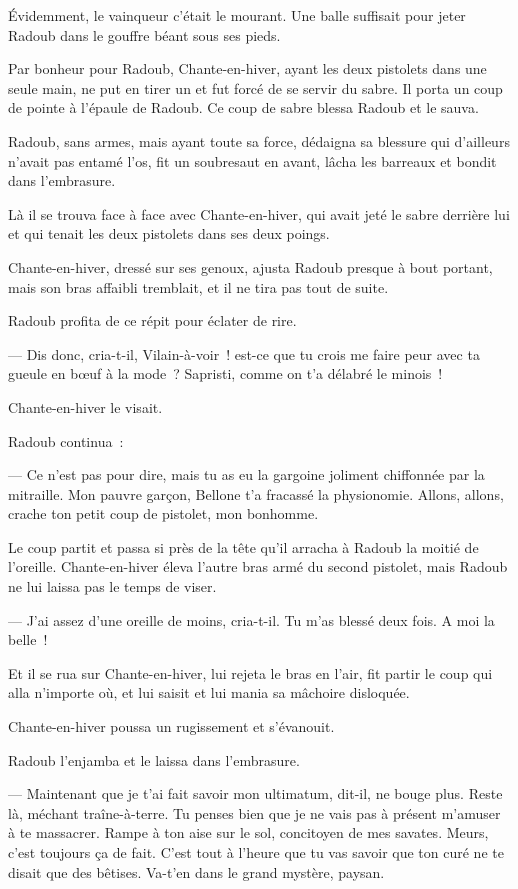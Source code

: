 \documentclass[french,twoside]{book} %
\begin{document}
Évidemment, le vainqueur c’était le mourant. Une balle suffisait pour jeter Radoub dans le gouffre béant sous ses pieds.\par
Par bonheur pour Radoub, Chante-en-hiver, ayant les deux pistolets dans une seule main, ne put en tirer un et fut forcé de se servir du sabre. Il porta un coup de pointe à l’épaule de Radoub. Ce coup de sabre blessa Radoub et le sauva.\par
Radoub, sans armes, mais ayant toute sa force, dédaigna sa blessure qui d’ailleurs n’avait pas entamé l’os, fit un soubresaut en avant, lâcha les barreaux et bondit dans l’embrasure.\par
Là il se trouva face à face avec Chante-en-hiver, qui avait jeté le sabre derrière lui et qui tenait les deux pistolets dans ses deux poings.\par
Chante-en-hiver, dressé sur ses genoux, ajusta Radoub presque à bout portant, mais son bras affaibli tremblait, et il ne tira pas tout de suite.\par
Radoub profita de ce répit pour éclater de rire.\par
 — Dis donc, cria-t-il, Vilain-à-voir ! est-ce que tu crois me faire peur avec ta gueule en bœuf à la mode ? Sapristi, comme on t’a délabré le minois !\par
Chante-en-hiver le visait.\par
Radoub continua :\par
— Ce n’est pas pour dire, mais tu as eu la gargoine joliment chiffonnée par la mitraille. Mon pauvre garçon, Bellone t’a fracassé la physionomie. Allons, allons, crache ton petit coup de pistolet, mon bonhomme.\par
Le coup partit et passa si près de la tête qu’il arracha à Radoub la moitié de l’oreille. Chante-en-hiver éleva l’autre bras armé du second pistolet, mais Radoub ne lui laissa pas le temps de viser.\par
— J’ai assez d’une oreille de moins, cria-t-il. Tu m’as blessé deux fois. A moi la belle !\par
Et il se rua sur Chante-en-hiver, lui rejeta le bras en l’air, fit partir le coup qui alla n’importe où, et lui saisit et lui mania sa mâchoire disloquée.\par
Chante-en-hiver poussa un rugissement et s’évanouit.\par
Radoub l’enjamba et le laissa dans l’embrasure.\par
— Maintenant que je t’ai fait savoir mon ultimatum, dit-il, ne bouge plus. Reste là, méchant traîne-à-terre. Tu penses bien que je ne vais pas à présent m’amuser à te massacrer. Rampe à ton aise sur le sol, concitoyen de mes savates. Meurs, c’est toujours ça de fait. C’est tout à l’heure que tu vas savoir que ton curé ne te disait que des bêtises. Va-t’en dans le grand mystère, paysan.\par
\end{document}
